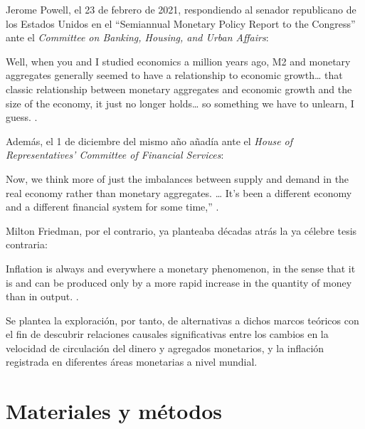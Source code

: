 \documentclass[titlepage, 12pt]{article}
\begin{document}
Jerome Powell, el 23 de febrero de 2021, respondiendo al senador republicano de los Estados Unidos en el \enquote{Semiannual Monetary Policy Report to the Congress} ante el \textit{Committee on Banking, Housing, and Urban Affairs}:
\begin{displayquote}
    \begin{otherlanguage}{english}
        Well, when you and I studied economics a million years ago, M2 and monetary aggregates generally seemed to have a relationship to economic growth… that classic relationship between monetary aggregates and economic growth and the size of the economy, it just no longer holds… so something we have to unlearn, I guess. \autocite{powell2021a}.
    \end{otherlanguage}
\end{displayquote}
Además, el 1 de diciembre del mismo año añadía ante el \textit{House of Representatives’ Committee of Financial Services}:
\begin{displayquote}
    \begin{otherlanguage}{english}
        Now, we think more of just the imbalances between supply and demand in the real economy rather than monetary aggregates. … It’s been a different economy and a different financial system for some time,” \autocite{powell2021b}.
    \end{otherlanguage}
\end{displayquote}

Milton Friedman, por el contrario, ya planteaba décadas atrás la ya célebre tesis contraria:
\begin{displayquote}
    \begin{otherlanguage}{english}
        Inflation is always and everywhere a monetary phenomenon, in the sense that it is and can be produced only by a more rapid increase in the quantity of money than in output. \autocite[24]{friedman1970}.
    \end{otherlanguage}
\end{displayquote}

Se plantea la exploración, por tanto, de alternativas a dichos marcos teóricos con el fin de descubrir relaciones causales significativas entre los cambios en la velocidad de circulación del dinero y agregados monetarios, y la inflación registrada en diferentes áreas monetarias a nivel mundial.

\section{Materiales y métodos}
\end{document}
